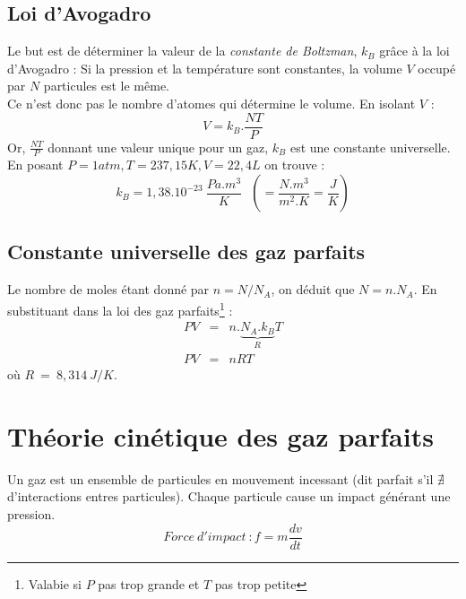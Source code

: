 \documentclass	[11pt, a4paper, openany]{book}
\begin{document}
\subsection{Loi d'Avogadro}
Le but est de déterminer la valeur de la \textit{constante de Boltzman}, $k_B$ grâce à la loi d'Avogadro : Si la pression et la température sont constantes, la volume $V$ occupé par $N$ particules est le même.\\ Ce n'est donc pas le nombre d'atomes qui détermine le volume. En isolant $V$ :
\begin{equation}
V = k_B . \frac{NT}{P}
\end{equation}
Or, $\frac{NT}{P}$ donnant une valeur unique pour un gaz, $k_B$ est une constante universelle. \\En posant $P=1atm, T = 237,15K, V = 22,4 L$ on trouve :
\begin{equation}
k_B = 1,38.10^{-23}\ \frac{Pa.m^3}{K}\ \ \  \left(= \frac{N.m^3}{m^2.K} = \frac{J}{K}\right)
\end{equation}

\subsection{Constante universelle des gaz parfaits}
Le nombre de moles étant donné par $n = N/N_A$, on déduit que $N = n.N_A$. En substituant dans la loi des gaz parfaits\footnote{Valabie si $P$ pas trop grande et $T$ pas trop petite} :
\begin{eqnarray}
PV &=& n.\underbrace{N_A.k_B}_R T\\
PV &=& nRT
\end{eqnarray}
où $R\ =\ 8,314\ J/K$.

\section{Théorie cinétique des gaz parfaits}
Un gaz est un ensemble de particules en mouvement incessant (dit parfait s'il $\nexists$ d'interactions entres particules). Chaque particule cause un impact générant une pression.
\begin{equation}
Force\ d'impact\ : f = m\frac{dv}{dt}
\end{equation}
\end{document}
